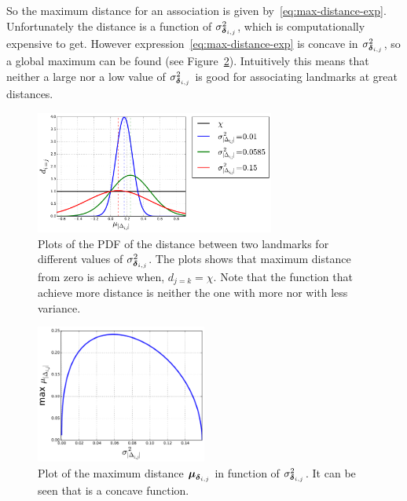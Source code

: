 So the maximum distance for an association is given by~\eqref{eq:max-distance-exp}. Unfortunately the distance is a function of $\sigma_{\bs{\delta}_{i,j}}^2$, which is computationally expensive to get. However expression~\eqref{eq:max-distance-exp} is concave in $\sigma_{\bs{\delta}_{i,j}}^2$, so a global maximum can be found (see Figure~\ref{fig:max-variance}). Intuitively this means that neither a large nor a low value of $\sigma_{\bs{\delta}_{i,j}}^2$ is good for associating landmarks at great distances. 

\begin{figure}[htbp!]
    \centering
    \includegraphics[width=0.7\textwidth]{imagenes/maxDistance.pdf}
    \caption[Plots of the PDF of the distance between two landmarks.]{Plots of the PDF of the distance between two landmarks for different values of $\sigma_{\bs{\delta}_{i,j}}^2$. The plots shows that maximum distance from zero is achieve when, $d_{j=k}=\chi$. Note that the function that achieve more distance is neither the one with more nor with less variance.}
    \label{fig:max-distance}
\end{figure}

\begin{figure}[htbp!]
    \centering
    \includegraphics[width=0.5\textwidth]{imagenes/maxVariance.pdf}
    \caption[Plot of the maximum distance $\bs{\mu}_{\bs{\delta}_{i,j}}$ in function of $\sigma_{\bs{\delta}_{i,j}}^2$.]{Plot of the maximum distance $\bs{\mu}_{\bs{\delta}_{i,j}}$ in function of $\sigma_{\bs{\delta}_{i,j}}^2$. It can be seen that is a concave function.}
    \label{fig:max-variance}
\end{figure}

